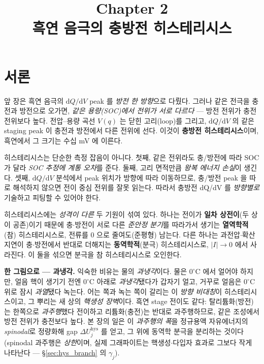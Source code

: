 \documentclass[11pt,a4paper]{article}
\title{\textbf{\LARGE Chapter 2}\\[0.35em]\Large 흑연 음극의 충방전 히스테리시스}
\author{}
\date{}
\newcommand{\dd}{\mathrm{d}}
\newcommand{\hys}{\mathrm{hys}}
\begin{document}
\maketitle

\section*{서론}
앞 장은 흑연 음극의 $\dd Q/\dd V$ peak 를 \emph{방전 한 방향}으로 다뤘다. 그러나 같은 전극을 충전과 방전으로
오가면, \emph{같은 용량(SOC)에서 전위가 서로 다르다} — 방전 전위가 충전 전위보다 높다. 전압--용량 곡선
$V(q)$ 는 닫힌 고리(loop)를 그리고, $\dd Q/\dd V$ 의 같은 staging peak 이 충전과 방전에서 다른 전위에 선다.
이것이 \textbf{충방전 히스테리시스}이며, 흑연에서 그 크기는 수십 mV 에 이른다.

히스테리시스는 단순한 측정 잡음이 아니다. 첫째, 같은 전위라도 충/방전에 따라 SOC 가 달라 \emph{SOC 추정에
계통 오차}를 준다. 둘째, 고리 면적만큼 \emph{왕복 에너지 손실}이 생긴다. 셋째, $\dd Q/\dd V$ 분석에서 peak
위치가 방향에 따라 이동하므로, 충/방전 peak 을 따로 해석하지 않으면 전이 중심 전위를 잘못 읽는다. 따라서 충방전
dQ/dV 를 \emph{방향별로} 기술하고 피팅할 수 있어야 한다.

히스테리시스에는 \emph{성격이 다른} 두 기원이 섞여 있다. 하나는 전이가 \textbf{일차 상전이}(두 상이 공존)이기
때문에 충$\cdot$방전이 서로 다른 \emph{준안정 분기}를 따라가서 생기는 \textbf{열역학적}(참) 히스테리시스로,
전류를 $0$ 으로 줄여도(준평형) 남는다. 다른 하나는 과전압$\cdot$확산 지연이 충$\cdot$방전에서 반대로 더해지는
\textbf{동역학적}(분극) 히스테리시스로, $|I|\to0$ 에서 사라진다. 이 둘을 섞으면 분극을 참 히스테리시스로
오인한다.

\textbf{한 그림으로 — 과냉각.} 익숙한 비유는 물의 \emph{과냉각}이다. 물은 $0^\circ$C 에서 얼어야 하지만, 얼음 핵이
생기기 전엔 $0^\circ$C 아래로 \emph{과냉각}됐다가 갑자기 얼고, 거꾸로 얼음은 $0^\circ$C 위로 잠시 \emph{과열}됐다
녹는다. 어는 쪽과 녹는 쪽이 갈리는 이 \emph{방향 비대칭}이 히스테리시스이고, 그 뿌리는 새 상의 \emph{핵생성
장벽}이다. 흑연 stage 전이도 같다: 탈리튬화(방전)는 한쪽으로 \emph{과주행}했다 전이하고 리튬화(충전)는 반대로
과주행하므로, 같은 조성에서 방전 전위가 충전보다 높다. 본 장의 일은 이 \emph{과주행의 폭}을 정규용액 자유에너지의
\emph{spinodal}로 정량화해 gap $\Delta U_j^\hys$ 를 얻고, 그 위에 동역학 분극을 분리하는 것이다(spinodal 과주행은
\emph{상한}이며, 실제 그래파이트는 핵생성$\cdot$다입자 효과로 그보다 작게 나타난다 — \S\ref{sec:hys_branch} 의 $\gamma_j$).
\end{document}
